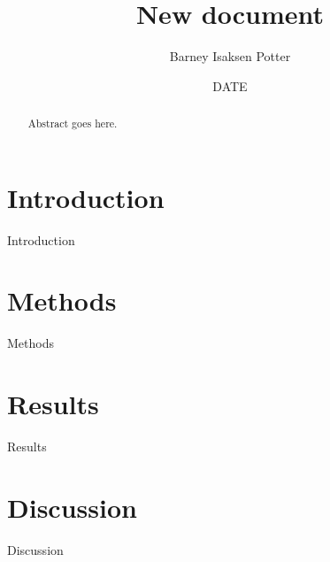 \documentclass[12pt, A4, twocolumn]{article}
\title{New document}
\author{Barney Isaksen Potter}
\date{DATE}
\begin{document}
\begin{titlepage}
\maketitle
\end{titlepage}

\begin{abstract}
  Abstract goes here.
\end{abstract}

\section{Introduction}

Introduction

\section{Methods}

Methods

\section{Results}

Results

\section{Discussion}

Discussion
\end{document}
